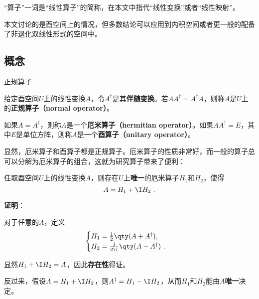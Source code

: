 




“算子”一词是“线性算子”的简称，在本文中指代“线性变换”或者“线性映射”。

本文讨论的是酉空间上的情况，但多数结论可以应用到内积空间或者更一般的配备了非退化双线性形式的空间中。


\subsection{概念}


\begin{definition}{正规算子}

给定酉空间$U$上的线性变换$A$，令$A^\dagger$是其\textbf{伴随变换}。若$AA^\dagger = A^\dagger A$，则称$A$是$U$上的\textbf{正规算子（normal operator）}。

如果$A=A^\dagger$，则称$A$是一个\textbf{厄米算子（hermitian operator）}。如果$AA^\dagger = E$，其中$E$是单位方阵，则称$A$是一个\textbf{酉算子（unitary operator）}。

\end{definition}


显然，厄米算子和酉算子都是正规算子。厄米算子的性质非常好，而一般的算子总可以分解为厄米算子的组合，这就为研究算子带来了便利：



\begin{lemma}{}
任取酉空间$U$上的线性变换$A$，则存在$U$上\textbf{唯一}的厄米算子$H_1$和$H_2$，使得
\begin{equation}
A = H_1 + \I H_2~. 
\end{equation}
\end{lemma}


\textbf{证明}：

对于任意的$A$，定义
\begin{equation}
\begin{cases}
H_1 =\frac{1}{2}\qty(A+A^\dagger), \\
H_2 =\frac{1}{2\I}\qty(A-A^\dagger)~. 
\end{cases}
\end{equation}

显然$H_1+\I H_2=A$，因此\textbf{存在性}得证。

反过来，假设$A = H_1 + \I H_2$，则$A^\dagger = H_1 - \I H_2$，从而$H_1$和$H_2$能由$A$\textbf{唯一}决定。

